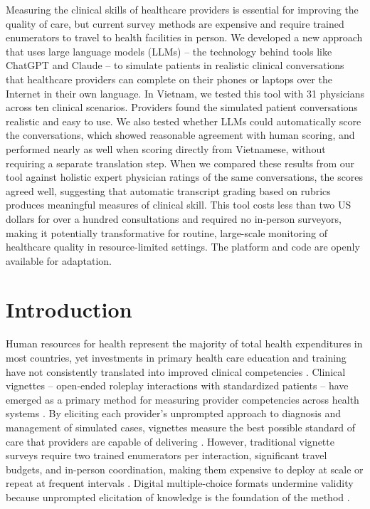 \documentclass{article}
\begin{document}
Measuring the clinical skills of healthcare providers is essential for improving the quality of care, but current survey methods are expensive and require trained enumerators to travel to health facilities in person. We developed a new approach that uses large language models (LLMs) -- the technology behind tools like ChatGPT and Claude -- to simulate patients in realistic clinical conversations that healthcare providers can complete on their phones or laptops over the Internet in their own language. In Vietnam, we tested this tool with 31 physicians across ten clinical scenarios. Providers found the simulated patient conversations realistic and easy to use. We also tested whether LLMs could automatically score the conversations, which showed reasonable agreement with human scoring, and performed nearly as well when scoring directly from Vietnamese, without requiring a separate translation step. When we compared these results from our tool against holistic expert physician ratings of the same conversations, the scores agreed well, suggesting that automatic transcript grading based on rubrics produces meaningful measures of clinical skill. This tool costs less than two US dollars for over a hundred consultations and required no in-person surveyors, making it potentially transformative for routine, large-scale monitoring of healthcare quality in resource-limited settings. The platform and code are openly available for adaptation.

\newpage


\section{Introduction}

Human resources for health represent the majority of total health expenditures in most countries, yet investments in primary health care education and training have not consistently translated into improved clinical competencies \citep{ranson2010priorities, rowe2018effectiveness, daniels2024medical, lilford2025policy}. Clinical vignettes -- open-ended roleplay interactions with standardized patients -- have emerged as a primary method for measuring provider competencies across health systems \citep{who2022global, das2005which, leonard2005use, andrews2021quality}. By eliciting each provider's unprompted approach to diagnosis and management of simulated cases, vignettes measure the best possible standard of care that providers are capable of delivering \citep{das2007money, daniels2024medical}. However, traditional vignette surveys require two trained enumerators per interaction, significant travel budgets, and in-person coordination, making them expensive to deploy at scale or repeat at frequent intervals \citep{andrews2021quality, das2023prices}. Digital multiple-choice formats undermine validity because unprompted elicitation of knowledge is the foundation of the method \citep{das2005which}.
\end{document}
